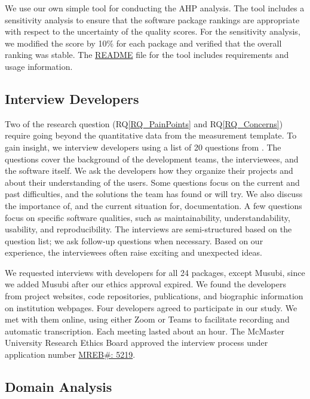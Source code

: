 \documentclass[final, 3p, times, authoryear]{elsarticle}
\newcommand{\rqref}[1]{RQ\ref{#1}}
\providecommand{\DIFaddend}{} %
\begin{document}
\DIFaddend We use our own simple tool for conducting the AHP analysis. The tool includes a
sensitivity analysis to ensure that the software package rankings are
appropriate with respect to the uncertainty of the quality scores. For the
sensitivity analysis, we modified the score by 10\% for each package and
verified that the overall ranking was stable.  
The
\href{https://github.com/smiths/AIMSS/blob/master/StateOfPractice/AHP2020/LBM/README.txt}{README}
file for the tool includes requirements and usage information. %

\subsection{Interview Developers} \label{SecSurvey}

Two of the research question (\rqref{RQ_PainPoints} and \rqref{RQ_Concerns})
require going beyond the quantitative data from the measurement template. To
gain insight, we interview developers using a list of 20 questions from 
\citet{SmithEtAl2021}. %
The questions cover the background of the development
teams, the interviewees, and the software itself. We ask the developers how they
organize their projects and about their understanding of the users. Some
questions focus on the current and past difficulties, and the solutions the team
has found or will try. We also discuss the importance of, and the current
situation for, documentation. A few questions focus on specific software
qualities, such as maintainability, understandability, usability, and
reproducibility. The interviews are semi-structured based on the question list;
we ask follow-up questions when necessary. Based on our experience, the
interviewees often raise exciting and unexpected ideas.

We requested interviews with developers for all 24 packages, except Musubi,
since we added Musubi after our ethics approval expired. We found the developers
from project websites, code repositories, publications, and biographic
information on institution webpages. Four developers agreed to participate in
our study. We met with them online, using either Zoom or Teams to facilitate
recording and automatic transcription. Each meeting lasted about an hour. 
The
McMaster University Research Ethics Board approved the interview process under
application number
\href{https://github.com/smiths/AIMSS/blob/master/StateOfPractice/MACREM/Application.pdf}
{MREB\#: 5219}. %

\subsection{Domain Analysis} \label{SecDomainAnalysis}
\end{document}
